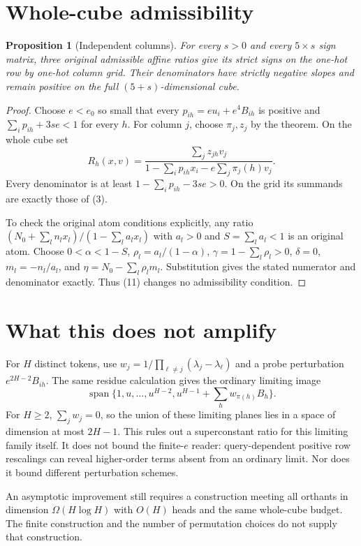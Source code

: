 \documentclass[11pt]{article}
\newtheorem{proposition}[theorem]{Proposition}
\begin{document}
\section{Whole-cube admissibility}
\begin{proposition}[Independent columns]
For every $s>0$ and every $5\times s$ sign matrix, three original
admissible affine ratios give its strict signs on the one-hot row
by one-hot column grid. Their denominators have strictly negative
slopes and remain positive on the full $(5+s)$-dimensional cube.
\end{proposition}
\begin{proof}
Choose $e<e_0$ so small that every $p_{ih}=eu_i+e^4B_{ih}$ is positive
and $\sum_i p_{ih}+3se<1$ for every $h$. For column $j$, choose
$\pi_j,z_j$ by the theorem. On the whole cube set
\[
 R_h(x,v)=\frac{\sum_j z_{jh}v_j}
 {1-\sum_i p_{ih}x_i-e\sum_j\pi_j(h)v_j}. \tag{11}
\]
Every denominator is at least $1-\sum_i p_{ih}-3se>0$. On the
grid its summands are exactly those of (3).

To check the original atom conditions explicitly, any ratio
$(N_0+\sum_l n_lx_l)/(1-\sum_l a_lx_l)$ with $a_l>0$ and
$S=\sum_l a_l<1$ is an original atom. Choose $0<\alpha<1-S$,
$\rho_l=a_l/(1-\alpha)$, $\gamma=1-\sum_l\rho_l>0$,
$\delta=0$, $m_l=-n_l/a_l$, and
$\eta=N_0-\sum_l\rho_lm_l$. Substitution gives the stated numerator
and denominator exactly. Thus (11) changes no admissibility condition.
\end{proof}

\section{What this does not amplify}
For $H$ distinct tokens, use
$w_j=1/\prod_{\ell\ne j}(\lambda_j-\lambda_\ell)$ and a probe
perturbation $e^{2H-2}B_{ih}$. The same residue calculation gives
the ordinary limiting image
\[
 \operatorname{span}\{1,u,\ldots,u^{H-2},
          u^{H-1}+\sum_h w_{\pi(h)}B_h\}. \tag{12}
\]
For $H\geq2$, $\sum_jw_j=0$, so the union of these limiting planes
lies in a space of dimension at most $2H-1$. This rules out a
superconstant ratio for this limiting family itself. It does not
bound the finite-$e$ reader: query-dependent positive row rescalings
can reveal higher-order terms absent from an ordinary limit.
Nor does it bound different perturbation schemes.

An asymptotic improvement still requires a construction meeting all
orthants in dimension $\Omega(H\log H)$ with $O(H)$ heads and the
same whole-cube budget. The finite construction and the number of
permutation choices do not supply that construction.
\end{document}
